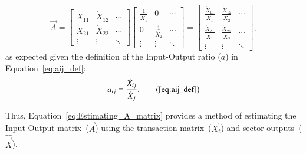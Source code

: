 \begin{equation}
	\vec{A}
	=
	\begin{bmatrix}
		\dot{X}_{11} & \dot{X}_{12} & \cdots \\[0.65em]
		\dot{X}_{21} & \dot{X}_{22} & \cdots \\[0.35em]
		\vdots       & \vdots       & \ddots
	\end{bmatrix}
	\begin{bmatrix}
		\frac{1}{\dot{X}_{1}} & 0                     & \cdots \\[0.55em]
		0                     & \frac{1}{\dot{X}_{2}} & \cdots \\[0.25em]
		\vdots                & \vdots                & \ddots
	\end{bmatrix}
	=
	\begin{bmatrix}
		\frac{\dot{X}_{11}}{\dot{X}_{1}} & \frac{\dot{X}_{12}}{\dot{X}_{2}} & \cdots \\
		\frac{\dot{X}_{21}}{\dot{X}_{1}} & \frac{\dot{X}_{22}}{\dot{X}_{2}} & \cdots \\
		\vdots       & \vdots       & \ddots
	\end{bmatrix},
\end{equation}
%
as expected
given the definition of the Input-Output ratio ($a$) 
in Equation~\ref{eq:aij_def}:
%
\begin{equation}
	a_{ij} 
	\equiv \frac{\dot{X}_{ij}}{\dot{X}_{j}}.\tag{\ref{eq:aij_def}}
\end{equation}

Thus, Equation~\ref{eq:Estimating_A_matrix} provides a method 
of estimating the Input-Output matrix~($\vec{A}$) using
the transaction matrix~($\vec{X}_{t}$)
and sector outputs~($\hat{\vec{X}}$).



